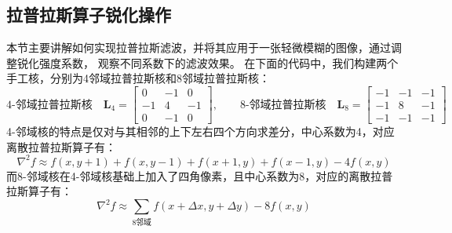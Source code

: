 \documentclass[11pt]{article}
\begin{document}
    \subsection{拉普拉斯算子锐化操作}
    本节主要讲解如何实现拉普拉斯滤波，并将其应用于一张轻微模糊的图像，通过调整锐化强度系数， 观察不同系数下的滤波效果。
    在下面的代码中，我们构建两个手工核，分别为4邻域拉普拉斯核和8邻域拉普拉斯核：\\
    $$\text{4-邻域拉普拉斯核}\quad
    \mathbf{L}_4=
    \begin{bmatrix}
    	0  & -1 & 0 \\
    	-1 & 4  & -1\\
    	0  & -1 & 0
    \end{bmatrix},
    \qquad
    \text{8-邻域拉普拉斯核}\quad
    \mathbf{L}_8=
    \begin{bmatrix}
    	-1 & -1 & -1\\
    	-1 & 8  & -1\\
    	-1 & -1 & -1
    \end{bmatrix}
    $$
    4-邻域核的特点是仅对与其相邻的上下左右四个方向求差分，中心系数为4，对应离散拉普拉斯算子有：
    $$\nabla^2 f \approx f(x,y+1)+f(x,y-1)+f(x+1,y)+f(x-1,y) - 4f(x,y)$$
    而8-邻域核在4-邻域核基础上加入了四角像素，且中心系数为8，对应的离散拉普拉斯算子有：
    $$\nabla^2 f \approx \sum_{\text{8邻域}}f(x+\Delta x,y+\Delta y) - 8f(x,y)$$
    
\end{document}

